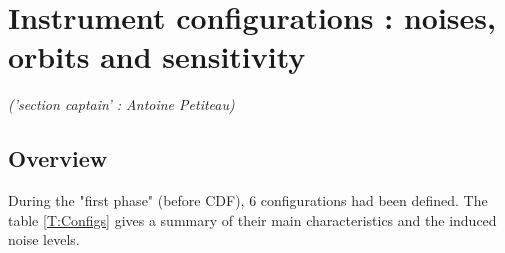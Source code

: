 \documentclass{iopart}
\begin{document}









\maketitle

\tableofcontents

\section{ Instrument configurations : noises, orbits and sensitivity }
\label{S:Instrument}
{\it ('section captain' : Antoine Petiteau)}


\subsection{Overview}
\label{SS:Inst:Overview}

During the "first phase" (before CDF), 6 configurations had been defined. The table \ref{T:Configs} gives a summary of their main characteristics and the induced noise levels.
\end{document}
